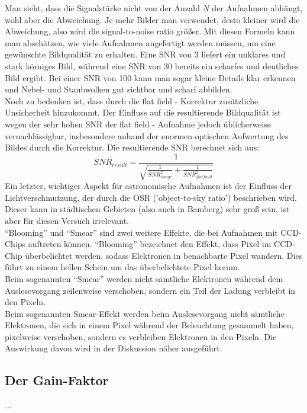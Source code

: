 Man sieht, dass die Signalstärke nicht von der Anzahl $N$ der Aufnahmen abhängt, wohl aber die Abweichung. Je mehr Bilder man verwendet, desto kleiner wird die Abweichung, also wird die signal-to-noise ratio größer. Mit diesen Formeln kann man abschätzen, wie viele Aufnahmen angefertigt werden müssen, um eine gewünschte Bildqualität zu erhalten. Eine SNR von 3 liefert ein unklares und stark körniges Bild, während eine SNR von 30 bereits ein scharfes und deutliches Bild ergibt. Bei einer SNR von 100 kann man sogar kleine Details klar erkennen und Nebel- und Staubwolken gut sichtbar und scharf abbilden.
\\
Noch zu bedenken ist, dass durch die flat field - Korrektur zusätzliche Unsicherheit hinzukommt. Der Einfluss auf die resultierende Bildqualität ist wegen der sehr hohen SNR der flat field - Aufnahme jedoch üblicherweise vernachlässigbar, insbesondere anhand der enormen optischen Aufwertung des Bildes durch die Korrektur. Die resultierende SNR berechnet sich aus:
\begin{equation}
SNR_{result} = \frac{1}{\sqrt{\frac{1}{SNR_{image}^2} + \frac{1}{SNR_{flatfield}^2}}}
\end{equation}
Ein letzter, wichtiger Aspekt für astronomische Aufnahmen ist der Einfluss der Lichtverschmutzung, der durch die OSR ('object-to-sky ratio') beschrieben wird. Dieser kann in städtischen Gebieten (also auch in Bamberg) sehr groß sein, ist aber für diesen Versuch irrelevant.\\
\enquote{Blooming} und \enquote{Smear} sind zwei weitere Effekte, die bei Aufnahmen mit CCD-Chips auftreten können. 
\enquote{Blooming} bezeichnet den Effekt, dass Pixel im CCD-Chip überbelichtet werden, sodass Elektronen in benachbarte Pixel wandern. Dies führt zu einem hellen Schein um das überbelichtete Pixel herum. \\
Beim sogenannten \enquote{Smear} werden nicht sämtliche Elektronen während dem Auslesevorgang zeilenweise verschoben, sondern ein Teil der Ladung verbleibt in den Pixeln. \\
Beim sogenannten Smear-Effekt werden beim Auslesevorgang nicht sämtliche Elektronen, die sich in einem Pixel während der Beleuchtung gesammelt haben, pixelweise verschoben, sondern es verbleiben Elektronen in den Pixeln. Die Auswirkung davon wird in der Diskussion näher ausgeführt. 

\subsection{Der Gain-Faktor}
...

